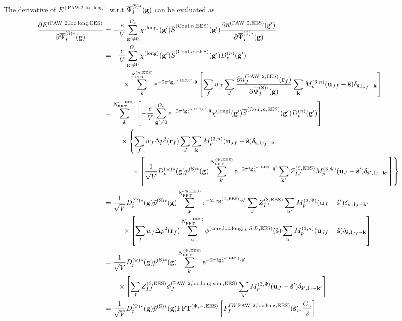 \documentclass[paper=a4, fontsize=11pt]{article} %
\numberwithin{equation}{section} %
\numberwithin{figure}{section} %
\numberwithin{table}{section} %
\newcommand{\p}{\partial}
\newcommand{\ol}{\overline}
\newcommand{\bu}{{\bf{u}}}
\newcommand{\bl}{{\bf{l}}}
\newcommand{\bk}{{\bf{k}}}
\newcommand{\bs}{{\bf{s}}}
\newcommand{\bg}{{\bf{g}}}
\newcommand{\br}{{\bf{r}}}
\newcommand{\hs}{{\hat{\bf{s}}}}
\newcommand{\rS}{{\mathrm{S}}}
\newcommand{\rEES}{{\mathrm{EES}}}
\newcommand{\rcore}{{\mathrm{core}}}
\newcommand{\re}{{\mathrm{e}}}
\newcommand{\rCo}{{\mathrm{Coul}}}
\newcommand{\rlong}{{\mathrm{long}}}
\newcommand{\rP}{{\mathrm{PAW}}}
\newcommand{\rsum}{{\mathrm{sum}}}
\newcommand{\rlo}{{\mathrm{loc}}}
\newcommand{\gcpEES}{{\bg_c^{(\Psi,\rEES)}}}
\newcommand{\gcnEES}{{\bg_c^{(n,\rEES)}}}
\newcommand{\psigsc}{{\overline \Psi_I^{(\rS)*}(\bg)}}
\newcommand{\NFFTnEES}{{N^{(n,\rEES)}_{\mathrm{FFT}}}}
\newcommand{\NFFTpEES}{{N^{\mathrm{(\Psi,\rEES})}_{\mathrm{FFT}}}}
\newcommand{\Gc}{{G_{\mathrm{c}}}}
\newcommand{\hGc}{{\frac{G_{\mathrm{c}}}{2}}}
\newcommand{\Dpgc}{{D^{(\Psi)*}_p(\bg)}}
\newcommand{\Mn}{{M_p^{(3,n)}}}
\newcommand{\Mp}{{M_p^{(3,\Psi)}}}
\newcommand{\FFTpiEES}{{\mathrm{FFT}^{(\Psi,-,\rEES)}}}
\begin{document}
The derivative of $E^{(\rP\ 2,\rlo,\rlong)}$ w.r.t $\psigsc$ can be evaluated as
\begin{equation}
\begin{split}
\frac{\p E^{(\rP\ 2,\rlo,\rlong,\rEES)}}{ \p \psigsc}
&= - \frac{e}{V} \sum_{\bg' \neq 0}^{\Gc} \chi^{(\rlong)}(\bg')  \ol S^{(\rCo,n,\rEES)}(\bg') \frac{\p \ol n^{(\rP\ 2,\rEES)}(\bg')}{\p \psigsc} \\
&=  - \frac{e}{V} \sum_{\bg' \neq 0}^{\Gc} \chi^{(\rlong)}(\bg')  \ol S^{(\rCo,n,\rEES)}(\bg') D_p^{(n)}(\bg') \\
&\ \ \ \ \ \ \ \ \times \sum_{\hat \bs}^\NFFTnEES \re^{-2\pi i\gcnEES' \cdot \hat\bs}\left[\sum_f w_f \sum_J \frac{\p n_J^{(\rP\ 2,\rEES)}(\br_f) }{\p \psigsc}\sum_{\bk}  \Mn(\bu_{Jf}-\hat \bs)\delta_{\hat \bs,\bl_{Jf}-\bk}\right] \\
&= \sum_{\hat \bs}^\NFFTnEES \left[-\frac{e}{V} \sum_{\bg' \neq 0}^{\Gc} \re^{-2\pi i\gcnEES' \cdot \hat\bs} \chi^{(\rlong)}(\bg')  \ol S^{(\rCo,n,\rEES)}(\bg') D_p^{(n)}(\bg') \right] \\
&\ \ \ \ \ \ \ \times\left\{\sum_f w_f \Delta p^2(\br_f)\sum_J \sum_{\bk}  \Mn(\bu_{Jf}-\hat \bs)\delta_{\hat \bs,\bl_{Jf}-\bk}\right. \\
& \left. \ \ \ \ \ \ \ \ \ \ \ \ \times \left[\frac{1}{\sqrt{V}} \Dpgc \tilde p^{(\rS)*}(\bg) \sum_{\hat \bs'}^\NFFTpEES \re^{-2\pi i\gcpEES \cdot \hat\bs'} \sum_{\bk'}Z_{IJ}^{(\rS,\rEES)} \Mp(\bu_{J}-\hat \bs')\delta_{\hat \bs',\bl_J-\bk'} \right]\right\}\\
&= \frac{1}{\sqrt{V}} \Dpgc \tilde p^{(\rS)*}(\bg) \sum_{\hat \bs'}^\NFFTpEES \re^{-2\pi i\gcpEES \cdot \hat\bs'} \sum_J Z_{IJ}^{(\rS,\rEES)} \sum_{\bk'} \Mp(\bu_{J}-\hat \bs') \delta_{\hat \bs',\bl_J-\bk'} \\
&\ \ \ \ \ \ \ \ \times \left[\sum_f w_f \Delta p^2(\br_f) \sum_{\hat \bs}^\NFFTnEES \phi^{(\rcore,\rlo,\rlong,\chi,S,D,\rEES)}(\hs) \sum_{\bk}  \Mn(\bu_{Jf}-\hat \bs)\delta_{\hat \bs,\bl_{Jf}-\bk}\right] \\
&= \frac{1}{\sqrt{V}} \Dpgc \tilde p^{(\rS)*}(\bg) \sum_{\hat \bs'}^\NFFTpEES \re^{-2\pi i\gcpEES \cdot \hat\bs'} \\
&\ \ \ \ \ \ \times \left[\sum_J Z_{IJ}^{(\rS,\rEES)}  \phi_J^{(\rP\ 2,\rlo,\rlong,\rsum,\rEES)}\sum_{\bk'} \Mp(\bu_{J}-\hat \bs') \delta_{\hat \bs',\bl_J-\bk'}\right] \\
&= \frac{1}{\sqrt{V}} \Dpgc \tilde p^{(\rS)*}(\bg) \FFTpiEES\left[ F_I^{(W,\rP\ 2,\rlo,\rlong,\rEES)}(\hs) ,\hGc\right]\\
\end{split}
\end{equation}
\end{document}
